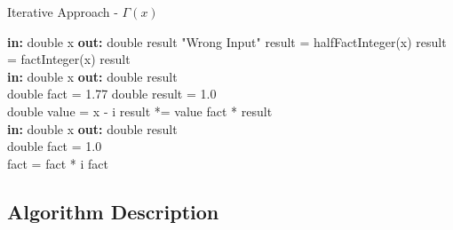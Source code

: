 \documentclass[a4paper,12pt]{article}
\begin{document}
    \newpage
    \begin{algorithm}
    \caption{Iterative Approach - $\Gamma(x)$ }
    \begin{algorithmic}
        \State \textbf{in: } double x
        \State \textbf{out: } double result
            \Return "Wrong Input"
        \Else {}
         \State result = halfFactInteger(x)
            \Else
            \State result = factInteger(x)
            \EndIf
        \State
        \Return result
        \EndIf
    \EndProcedure
    \\
    \State \textbf{in: } double x
    \State \textbf{out: } double result
    \\
    \State double fact = 1.77
    \State double result = 1.0
    \\
        \State double value = x - i
        \State result *= value
    \EndFor
    \Return fact * result
    \EndProcedure
    \\
    \State \textbf{in: } double x
    \State \textbf{out: } double result
    \\
    \State double fact = 1.0
    \\
        \State fact = fact * i
    \EndFor
    \Return fact
    \EndProcedure
    \\
    \end{algorithmic}
    \end{algorithm}

    \subsection{Algorithm Description}
\end{document}
